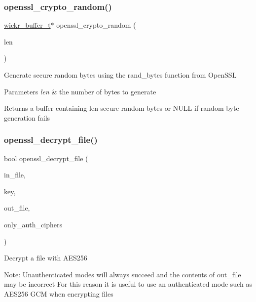 \subsubsection{\texorpdfstring{openssl\+\_\+crypto\+\_\+random()}{openssl\_crypto\_random()}}
{\footnotesize\ttfamily \hyperlink{structwickr__buffer}{wickr\+\_\+buffer\+\_\+t}$\ast$ openssl\+\_\+crypto\+\_\+random (\begin{DoxyParamCaption}\item[{size\+\_\+t}]{len }\end{DoxyParamCaption})}

Generate secure random bytes using the rand\+\_\+bytes function from Open\+S\+SL


\begin{DoxyParams}{Parameters}
{\em len} & the number of bytes to generate \\
\hline
\end{DoxyParams}
\begin{DoxyReturn}{Returns}
a buffer containing \textquotesingle{}len\textquotesingle{} secure random bytes or N\+U\+LL if random byte generation fails 
\end{DoxyReturn}
\mbox{\label{group__openssl__crypto_gaf1faa509e06c188acfbdf43e2197c61a}} 
\subsubsection{\texorpdfstring{openssl\+\_\+decrypt\+\_\+file()}{openssl\_decrypt\_file()}}
{\footnotesize\ttfamily bool openssl\+\_\+decrypt\+\_\+file (\begin{DoxyParamCaption}\item[{F\+I\+LE $\ast$}]{in\+\_\+file,  }\item[{const \hyperlink{structwickr__cipher__key}{wickr\+\_\+cipher\+\_\+key\+\_\+t} $\ast$}]{key,  }\item[{F\+I\+LE $\ast$}]{out\+\_\+file,  }\item[{bool}]{only\+\_\+auth\+\_\+ciphers }\end{DoxyParamCaption})}

Decrypt a file with A\+E\+S256

Note\+: Unauthenticated modes will always succeed and the contents of \textquotesingle{}out\+\_\+file\textquotesingle{} may be incorrect For this reason it is useful to use an authenticated mode such as A\+E\+S256 G\+CM when encrypting files


